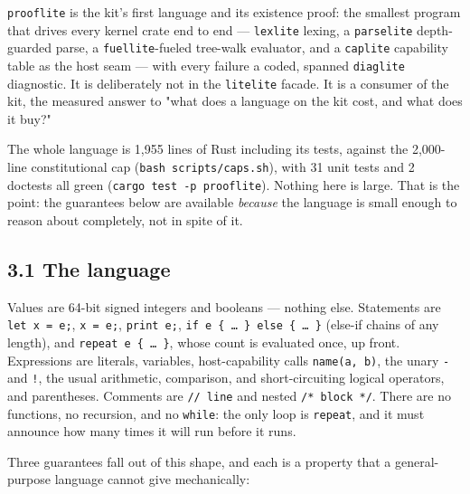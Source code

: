 \documentclass[11pt]{article}
\newcommand{\code}[1]{\texttt{#1}}
\begin{document}
\code{prooflite} is the kit's first language and its existence proof: the smallest
program that drives every kernel crate end to end --- \code{lexlite} lexing, a
\code{parselite} depth-guarded parse, a \code{fuellite}-fueled tree-walk evaluator, and a
\code{caplite} capability table as the host seam --- with every failure a coded,
spanned \code{diaglite} diagnostic. It is deliberately not in the \code{litelite} facade.
It is a consumer of the kit, the measured answer to "what does a language on the
kit cost, and what does it buy?"

The whole language is 1,955 lines of Rust including its tests, against the
2,000-line constitutional cap (\code{bash scripts/caps.sh}), with 31 unit tests and
2 doctests all green (\code{cargo test -p prooflite}). Nothing here is large. That is
the point: the guarantees below are available \emph{because} the language is small
enough to reason about completely, not in spite of it.

\subsection*{3.1 The language}

Values are 64-bit signed integers and booleans --- nothing else. Statements are
\code{let x = e;}, \code{x = e;}, \code{print e;}, \code{if e \{ \ldots{} \} else \{ \ldots{} \}} (else-if chains of
any length), and \code{repeat e \{ \ldots{} \}}, whose count is evaluated once, up front.
Expressions are literals, variables, host-capability calls \code{name(a, b)}, the
unary \code{-} and \code{!}, the usual arithmetic, comparison, and short-circuiting
logical operators, and parentheses. Comments are \code{// line} and nested
\code{/* block */}. There are no functions, no recursion, and no \code{while}: the only
loop is \code{repeat}, and it must announce how many times it will run before it
runs.

Three guarantees fall out of this shape, and each is a property that a
general-purpose language cannot give mechanically:
\end{document}
